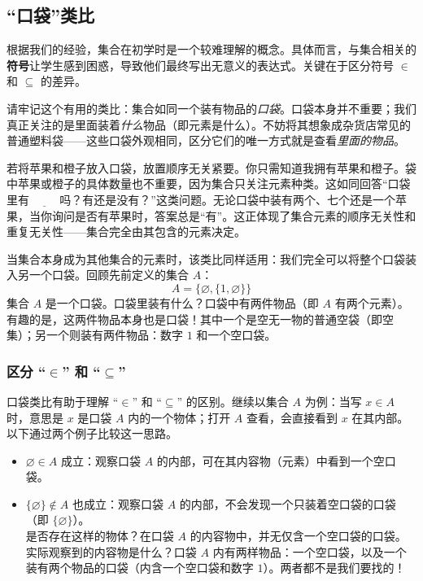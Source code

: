 \subsection{``口袋''类比}\label{sec:section3.4.4}

根据我们的经验，集合在初学时是一个较难理解的概念。具体而言，与集合相关的\textbf{符号}让学生感到困惑，导致他们最终写出无意义的表达式。关键在于区分符号 $\in$ 和 $\subseteq$ 的差异。

请牢记这个有用的类比：集合如同一个装有物品的\emph{口袋}。口袋本身并不重要；我们真正关注的是里面装着\emph{什么}物品（即元素是什么）。不妨将其想象成杂货店常见的普通塑料袋——这些口袋外观相同，区分它们的唯一方式就是查看\emph{里面的物品}。

若将苹果和橙子放入口袋，放置顺序无关紧要。你只需知道我拥有苹果和橙子。袋中苹果或橙子的具体数量也不重要，因为集合只关注元素种类。这如同回答``口袋里有 $\underline{\qquad}$ 吗？有还是没有？''这类问题。无论口袋中装有两个、七个还是一个苹果，当你询问是否有苹果时，答案总是``有''。这正体现了集合元素的顺序无关性和重复无关性——集合完全由其包含的元素决定。

当集合本身成为其他集合的元素时，该类比同样适用：我们完全可以将整个口袋装入另一个口袋。回顾先前定义的集合 $A$：
\[A = \big\{\varnothing, \{1, \varnothing\}\big\}\]
集合 $A$ 是一个口袋。口袋里装有什么？口袋中有两件物品（即 $A$ 有两个元素）。有趣的是，这两件物品本身也是口袋！其中一个是空无一物的普通空袋（即空集）；另一个则装有两件物品：数字 $1$ 和一个空口袋。

\subsubsection*{区分 ``$\in$'' 和 ``$\subseteq$''}

口袋类比有助于理解 ``$\in$'' 和 ``$\subseteq$'' 的区别。继续以集合 $A$ 为例：当写 $x \in A$ 时，意思是 $x$ 是口袋 $A$ 内的一个物体；打开 $A$ 查看，会直接看到 $x$ 在其内部。以下通过两个例子比较这一思路。

\begin{itemize}
    \item $\varnothing \in A$ 成立：观察口袋 $A$ 的内部，可在其内容物（元素）中看到一个空口袋。
    \item $\{\varnothing\} \notin A$ 也成立：观察口袋 $A$ 的内部，不会发现一个只装着空口袋的口袋（即 $\{\varnothing\}$）。\\
    是否存在这样的物体？在口袋 $A$ 的内容物中，并无仅含一个空口袋的口袋。\\
    实际观察到的内容物是什么？口袋 $A$ 内有两样物品：一个空口袋，以及一个装有两个物品的口袋（内含一个空口袋和数字 $1$）。两者都不是我们要找的！
\end{itemize}

